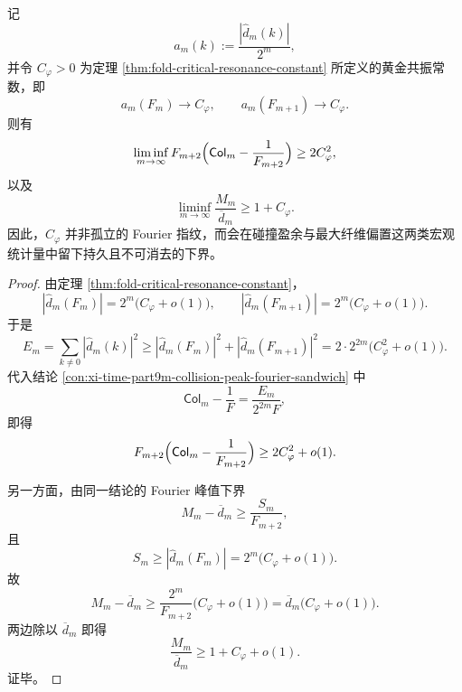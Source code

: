 \begin{conclusion}[黄金共振常数对碰撞缺口与峰值偏置的持久强制]\label{con:xi-time-part9m-cphi-forces-collision-gap-and-peak-bias}
记
\[
a_m(k):=\frac{|\widehat d_m(k)|}{2^m},
\]
并令 \(C_\varphi>0\) 为定理 \ref{thm:fold-critical-resonance-constant} 所定义的黄金共振常数，即
\[
a_m(F_m)\to C_\varphi,
\qquad
a_m(F_{m+1})\to C_\varphi.
\]
则有
\[
\liminf_{m\to\infty}
F_{m+2}\Bigl(\mathsf{Col}_m-\frac{1}{F_{m+2}}\Bigr)
\ge
2C_\varphi^2,
\]
以及
\[
\liminf_{m\to\infty}\frac{M_m}{\overline d_m}
\ge
1+C_\varphi.
\]
因此，\(C_\varphi\) 并非孤立的 Fourier 指纹，而会在碰撞盈余与最大纤维偏置这两类宏观统计量中留下持久且不可消去的下界。
\end{conclusion}
\begin{proof}
由定理 \ref{thm:fold-critical-resonance-constant}，
\[
|\widehat d_m(F_m)|=2^m\bigl(C_\varphi+o(1)\bigr),
\qquad
|\widehat d_m(F_{m+1})|=2^m\bigl(C_\varphi+o(1)\bigr).
\]
于是
\[
E_m=\sum_{k\ne 0}|\widehat d_m(k)|^2
\ge
|\widehat d_m(F_m)|^2+|\widehat d_m(F_{m+1})|^2
=
2\cdot 2^{2m}\bigl(C_\varphi^2+o(1)\bigr).
\]
代入结论 \ref{con:xi-time-part9m-collision-peak-fourier-sandwich} 中
\[
\mathsf{Col}_m-\frac1F=\frac{E_m}{2^{2m}F},
\]
即得
\[
F_{m+2}\Bigl(\mathsf{Col}_m-\frac{1}{F_{m+2}}\Bigr)\ge 2C_\varphi^2+o(1).
\]

另一方面，由同一结论的 Fourier 峰值下界
\[
M_m-\overline d_m\ge \frac{S_m}{F_{m+2}},
\]
且
\[
S_m\ge |\widehat d_m(F_m)|=2^m\bigl(C_\varphi+o(1)\bigr).
\]
故
\[
M_m-\overline d_m
\ge
\frac{2^m}{F_{m+2}}\bigl(C_\varphi+o(1)\bigr)
=
\overline d_m\bigl(C_\varphi+o(1)\bigr).
\]
两边除以 \(\overline d_m\) 即得
\[
\frac{M_m}{\overline d_m}\ge 1+C_\varphi+o(1).
\]
证毕。
\end{proof}



